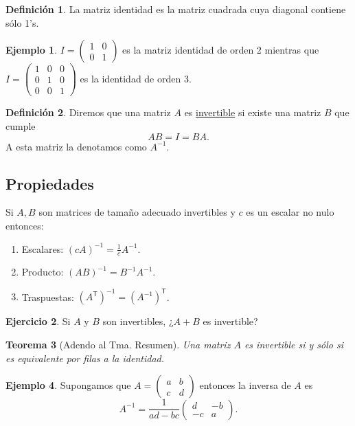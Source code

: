 \documentclass[12pt]{article}
\theoremstyle{plain}
\newtheorem{Th}{Teorema}  %
\theoremstyle{definition}
\newtheorem*{Def}{Definición}       %
\newtheorem{Ex}[Th]{Ejemplo}           %
\newtheorem{Ej}[Th]{Ejercicio}         %
\theoremstyle{remark}
\newcommand{\sT}{\mathsf{T}}            %
\renewcommand{\:}{\colon}           %
\newcommand{\un}[1]{\underline{#1}}
\renewcommand{\.}{\Cdot}                %
\begin{document}
\begin{multicols}{2}
\begin{Def}
La matriz identidad es la matriz cuadrada cuya diagonal contiene sólo 1's.
\end{Def}

\begin{Ex}
  $I=\begin{pmatrix}
    1&0\\0&1
  \end{pmatrix}$ es la matriz identidad de orden 2 mientras que $I=\begin{pmatrix}
    1&0&0\\0&1&0\\0&0&1
  \end{pmatrix}$ es la identidad de orden 3.
\end{Ex}

\begin{Def}
  Diremos que una matriz $A$ es \un{invertible} si existe una matriz $B$ que cumple 
  $$AB=I=BA.$$
  A esta matriz la denotamos como $A^{-1}$.
\end{Def}

\subsection*{Propiedades}
Si $A,B$ son matrices de tamaño adecuado invertibles y $c$ es un escalar no nulo entonces:
\begin{enumerate}
  \item Escalares: $(cA)^{-1}=\frac{1}{c}A^{-1}$.
  \item Producto: $(AB)^{-1}=B^{-1}A^{-1}$.
  \item Traspuestas: $(A^\sT)^{-1}=(A^{-1})^\sT$.
\end{enumerate}

\begin{Ej}
  Si $A$ y $B$ son invertibles, ¿$A+B$ es invertible?
\end{Ej}

\begin{Th}[Adendo al Tma. Resumen]
Una matriz $A$ es invertible si y sólo si es equivalente por filas a la identidad.
\end{Th}

\begin{Ex}
  Supongamos que $A=\begin{pmatrix}
    a&b\\c&d
  \end{pmatrix}$ entonces la inversa de $A$ es 
  $$A^{-1}=\frac{1}{ad-bc}\begin{pmatrix}
    d&-b\\-c&a
  \end{pmatrix}.$$
\end{Ex}


\end{multicols}
\end{document}
